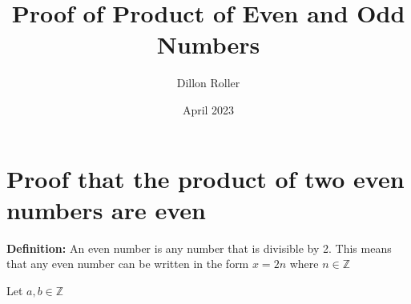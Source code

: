 \documentclass{article}
\title{Proof of Product of Even and Odd Numbers}
\author{Dillon Roller}
\date{April 2023}
\begin{document}
\maketitle

\section{Proof that the product of two even numbers are even}

\textbf{Definition:} An even number is any number that is divisible by 2. This means that any even number can be written in the form $x = 2n$ where $n \in \mathbb{Z}$

Let $a,b \in \mathbb{Z}$
\end{document}

